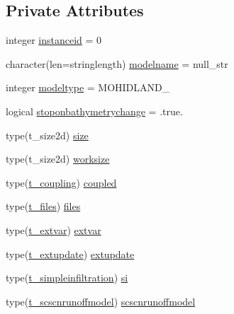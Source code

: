 \subsection*{Private Attributes}
\begin{DoxyCompactItemize}
\item 
integer \mbox{\hyperlink{structmodulebasin_1_1t__basin_ac05d7bc1a1c99ddac18d0e988b856e0b}{instanceid}} = 0
\item 
character(len=stringlength) \mbox{\hyperlink{structmodulebasin_1_1t__basin_a4c0ca0759d1dfabe6995a6e9dcf9c188}{modelname}} = null\+\_\+str
\item 
integer \mbox{\hyperlink{structmodulebasin_1_1t__basin_ae37a85c3313ad169952978645bfdf438}{modeltype}} = M\+O\+H\+I\+D\+L\+A\+N\+D\+\_\+
\item 
logical \mbox{\hyperlink{structmodulebasin_1_1t__basin_a2c0397ceffd6a1e5017476112d7eb4ef}{stoponbathymetrychange}} = .true.
\item 
type(t\+\_\+size2d) \mbox{\hyperlink{structmodulebasin_1_1t__basin_abfac4aafe2a35518f1e8406ff44b1cc0}{size}}
\item 
type(t\+\_\+size2d) \mbox{\hyperlink{structmodulebasin_1_1t__basin_a3d42f442922567fce0f085f375fd8bb2}{worksize}}
\item 
type(\mbox{\hyperlink{structmodulebasin_1_1t__coupling}{t\+\_\+coupling}}) \mbox{\hyperlink{structmodulebasin_1_1t__basin_ae41443d203f6055cba3083a62e8dbf27}{coupled}}
\item 
type(\mbox{\hyperlink{structmodulebasin_1_1t__files}{t\+\_\+files}}) \mbox{\hyperlink{structmodulebasin_1_1t__basin_a1efaba49725da281f86de77f48127bbe}{files}}
\item 
type(\mbox{\hyperlink{structmodulebasin_1_1t__extvar}{t\+\_\+extvar}}) \mbox{\hyperlink{structmodulebasin_1_1t__basin_a04885b93667c4494d960b3bbff634684}{extvar}}
\item 
type(\mbox{\hyperlink{structmodulebasin_1_1t__extupdate}{t\+\_\+extupdate}}) \mbox{\hyperlink{structmodulebasin_1_1t__basin_a18da76d3da119c78528ace512fc2250d}{extupdate}}
\item 
type(\mbox{\hyperlink{structmodulebasin_1_1t__simpleinfiltration}{t\+\_\+simpleinfiltration}}) \mbox{\hyperlink{structmodulebasin_1_1t__basin_a316b11c7d9c9cd693dd6db195385ae7d}{si}}
\item 
type(\mbox{\hyperlink{structmodulebasin_1_1t__scscnrunoffmodel}{t\+\_\+scscnrunoffmodel}}) \mbox{\hyperlink{structmodulebasin_1_1t__basin_acc20015ed60e3d9268973a3648db9d22}{scscnrunoffmodel}}
\item 

\end{DoxyCompactItemize}
